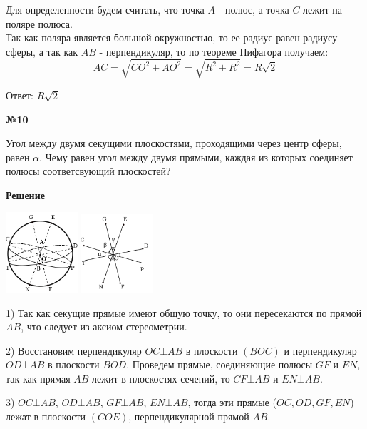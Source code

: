     Для определенности будем считать, что точка $A$ - полюс, а точка $C$ лежит на поляре полюса.\\

    Так как поляра является большой окружностью, то ее радиус равен радиусу сферы, а так как $AB$ - перпендикуляр,
    то по теореме Пифагора получаем:
    \[
        AC = \sqrt {CO ^ 2 + AO ^ 2} = \sqrt {R ^ 2 + R ^ 2} = R\sqrt {2}
    \]

    Ответ: $R\sqrt{2}$

    \begin{center}
        \textbf{№10}
    \end{center}

    Угол между двумя секущими плоскостями, проходящими через центр сферы, равен $\alpha$.
    Чему равен угол между двумя прямыми,
    каждая из которых соединяет полюсы соответсвующий плоскостей?

    \textbf{Решение}\\

    \begin{center}
        \includegraphics[width=0.2\textwidth]{images/img3} \quad
        \includegraphics[width=0.2\textwidth]{images/img4}\\
    \end{center}

    1) Так как секущие прямые имеют общую точку, то они пересекаются по прямой $AB$, что следует из аксиом стереометрии.

    2) Восстановим перпендикуляр $OC\bot AB$ в плоскости $(BOC)$ и перпендикуляр $OD \bot AB$ в плоскости $BOD$.
    Проведем прямые, соединяющие полюсы $GF$ и $EN$, так как прямая $AB$ лежит в плоскостях сечений,
    то $CF \bot AB$ и $EN \bot AB$.

    3) $OC \bot AB$, $OD \bot AB$, $GF \bot AB$, $EN \bot AB$,
    тогда эти прямые ($OC, OD, GF, EN$) лежат в плоскости $(COE)$, перпендикулярной прямой $AB$.

